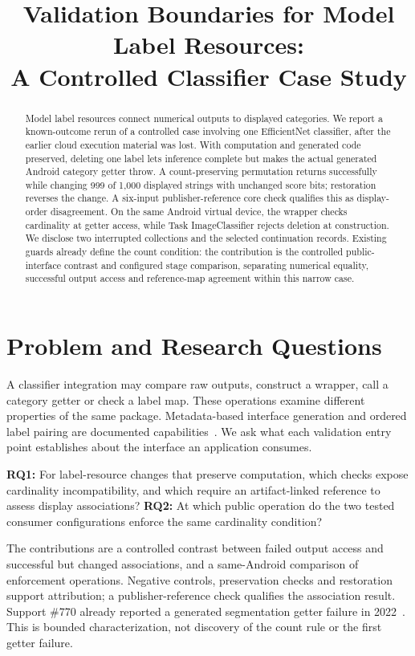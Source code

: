 \documentclass[10pt,conference]{IEEEtran}
\title{Validation Boundaries for Model Label Resources:\\A Controlled Classifier Case Study}
\author{\IEEEauthorblockN{Anonymous author(s)}}
\begin{document}
\maketitle

\begin{abstract}
Model label resources connect numerical outputs to displayed categories. We report a known-outcome rerun of a controlled case involving one EfficientNet classifier, after the earlier cloud execution material was lost. With computation and generated code preserved, deleting one label lets inference complete but makes the actual generated Android category getter throw. A count-preserving permutation returns successfully while changing 999 of 1,000 displayed strings with unchanged score bits; restoration reverses the change. A six-input publisher-reference core check qualifies this as display-order disagreement. On the same Android virtual device, the wrapper checks cardinality at getter access, while Task ImageClassifier rejects deletion at construction. We disclose two interrupted collections and the selected continuation records. Existing guards already define the count condition: the contribution is the controlled public-interface contrast and configured stage comparison, separating numerical equality, successful output access and reference-map agreement within this narrow case.
\end{abstract}

\section{Problem and Research Questions}
\label{sec:contracts}
A classifier integration may compare raw outputs, construct a wrapper, call a category getter or check a label map. These operations examine different properties of the same package. Metadata-based interface generation and ordered label pairing are documented capabilities~\cite{schema,codegen-doc,tensorlabel}. We ask what each validation entry point establishes about the interface an application consumes.

\textbf{RQ1:} For label-resource changes that preserve computation, which checks expose cardinality incompatibility, and which require an artifact-linked reference to assess display associations? \textbf{RQ2:} At which public operation do the two tested consumer configurations enforce the same cardinality condition?

The contributions are a controlled contrast between failed output access and successful but changed associations, and a same-Android comparison of enforcement operations. Negative controls, preservation checks and restoration support attribution; a publisher-reference check qualifies the association result. Support \#770 already reported a generated segmentation getter failure in 2022~\cite{support770,support770reply}. This is bounded characterization, not discovery of the count rule or the first getter failure.
\end{document}
